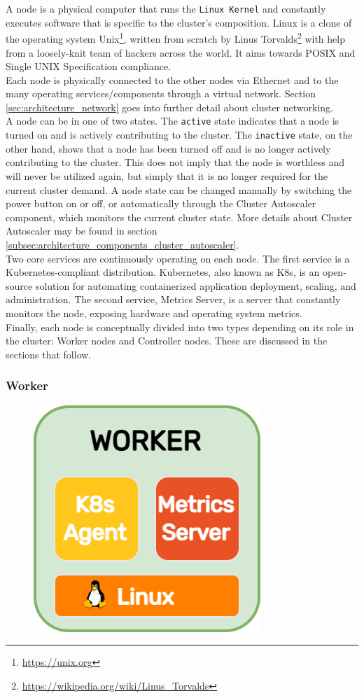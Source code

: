 A node is a physical computer that runs the \texttt{Linux Kernel} and constantly
executes software that is specific to the cluster's composition. Linux is a
clone of the operating system Unix\footnote{\url{https://unix.org}}, written from
scratch by Linus Torvalds\footnote{\url{https://wikipedia.org/wiki/Linus_Torvalds}}
with help from a loosely-knit team of hackers across the world. It aims towards
POSIX and Single UNIX Specification compliance\cite{linux}.\\ %
Each node is physically connected to the other nodes via Ethernet and to the
many operating services/components through a virtual network. Section \ref{sec:architecture_network}
goes into further detail about cluster networking. \\ %
A node can be in one of two states. The \texttt{active} state indicates that a node
is turned on and is actively contributing to the cluster. The \texttt{inactive} state,
on the other hand, shows that a node has been turned off and is no longer actively
contributing to the cluster. This does not imply that the node is worthless and
will never be utilized again, but simply that it is no longer required for the current
cluster demand. A node state can be changed manually by switching the power
button on or off, or automatically through the Cluster Autoscaler component,
which monitors the current cluster state. More details about Cluster Autoscaler may
be found in section \ref{subsec:architecture_components_cluster_autoscaler}. \\ %
Two core services are continuously operating on each node. The first service is
a Kubernetes-compliant distribution. Kubernetes, also known as K8s, is an open-source
solution for automating containerized application deployment, scaling, and administration\cite{k8s}.
The second service, Metrics Server, is a server that constantly monitors the node,
exposing hardware and operating system metrics. \\ %
Finally, each node is conceptually divided into two types depending on its role in
the cluster: Worker nodes and Controller nodes. These are discussed in the sections
that follow.

\subsubsection{Worker}
\label{subsubsec:architecture_components_node_worker}

\begin{figure}
  \centering
  \includegraphics[width=.2\textwidth]{images/architecture/worker.png}
\end{figure}

